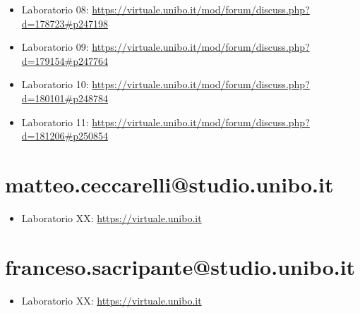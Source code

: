\documentclass[a4paper,12pt]{report}
\begin{document}
\begin{itemize}
	\item Laboratorio 08: \url{https://virtuale.unibo.it/mod/forum/discuss.php?d=178723#p247198}
	\item Laboratorio 09: \url{https://virtuale.unibo.it/mod/forum/discuss.php?d=179154#p247764}
	\item Laboratorio 10: \url{https://virtuale.unibo.it/mod/forum/discuss.php?d=180101#p248784}
	\item Laboratorio 11: \url{https://virtuale.unibo.it/mod/forum/discuss.php?d=181206#p250854}
\end{itemize}

\section{matteo.ceccarelli@studio.unibo.it}
\begin{itemize}
	\item Laboratorio XX: \url{https://virtuale.unibo.it}
\end{itemize}

\section{franceso.sacripante@studio.unibo.it}
\begin{itemize}
	\item Laboratorio XX: \url{https://virtuale.unibo.it}
\end{itemize}




\end{document}
